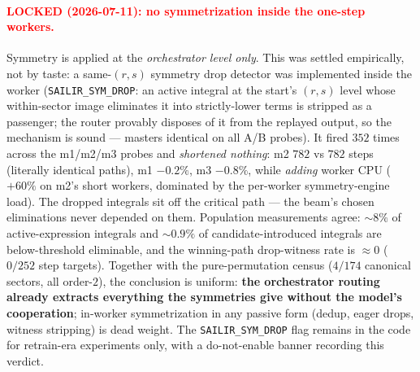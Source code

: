 \documentclass[11pt]{article}
\newcommand{\code}[1]{\texttt{#1}}
\begin{document}
\paragraph{\textcolor{red}{LOCKED (2026-07-11): no symmetrization inside the
one-step workers.}} Symmetry is applied at the \emph{orchestrator level only}. This
was settled empirically, not by taste: a same-$(r,s)$ symmetry drop detector was
implemented inside the worker (\code{SAILIR\_SYM\_DROP}: an active integral at the
start's $(r,s)$ level whose within-sector image eliminates it into strictly-lower
terms is stripped as a passenger; the router provably disposes of it from the
replayed output, so the mechanism is sound --- masters identical on all A/B probes).
It fired $352$ times across the m1/m2/m3 probes and \emph{shortened nothing}: m2
$782$ vs $782$ steps (literally identical paths), m1 $-0.2\%$, m3 $-0.8\%$, while
\emph{adding} worker CPU ($+60\%$ on m2's short workers, dominated by the per-worker
symmetry-engine load). The dropped integrals sit off the critical path --- the beam's
chosen eliminations never depended on them. Population measurements agree: $\sim8\%$
of active-expression integrals and $\sim0.9\%$ of candidate-introduced integrals are
below-threshold eliminable, and the winning-path drop-witness rate is $\approx0$
($0/252$ step targets). Together with the pure-permutation census ($4/174$ canonical
sectors, all order-$2$), the conclusion is uniform: \textbf{the orchestrator routing
already extracts everything the symmetries give without the model's cooperation};
in-worker symmetrization in any passive form (dedup, eager drops, witness stripping)
is dead weight. The \code{SAILIR\_SYM\_DROP} flag remains in the code for
retrain-era experiments only, with a do-not-enable banner recording this verdict.
\end{document}
